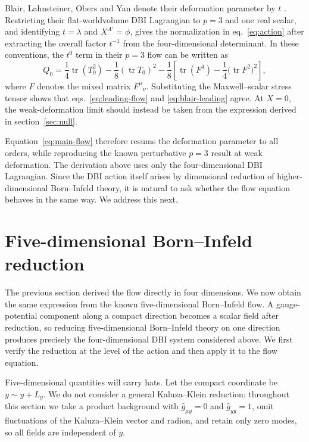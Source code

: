 \documentclass[a4paper,11pt]{article}
\numberwithin{equation}{section}
\newcommand{\tr}{\operatorname{tr}}
\begin{document}
Blair, Lahnsteiner, Obers and Yan denote their deformation parameter by $t$ \cite{Blair2025}. Restricting their flat-worldvolume DBI Lagrangian to $p=3$ and one real scalar, and identifying $t=\lambda$ and $X^{A'}=\phi$, gives the normalization in eq.~\eqref{eq:action} after extracting the overall factor $t^{-1}$ from the four-dimensional determinant. In these conventions, the $t^0$ term in their $p=3$ flow can be written as
\begin{equation}
 Q_0
 =\frac14\tr(T_0^2)-\frac18(\tr T_0)^2
 -\frac18\left[\tr(F^4)-\frac14\bigl(\tr F^2\bigr)^2\right],
 \label{eq:blair-leading}
\end{equation}
where $F$ denotes the mixed matrix $F^\mu{}_{\nu}$. Substituting the Maxwell--scalar stress tensor shows that eqs.~\eqref{eq:leading-flow} and \eqref{eq:blair-leading} agree. At $X=0$, the weak-deformation limit should instead be taken from the expression derived in section~\ref{sec:null}.

Equation~\eqref{eq:main-flow} therefore resums the deformation parameter to all orders, while reproducing the known perturbative $p=3$ result at weak deformation. The derivation above uses only the four-dimensional DBI Lagrangian. Since the DBI action itself arises by dimensional reduction of higher-dimensional Born--Infeld theory, it is natural to ask whether the flow equation behaves in the same way. We address this next.

\section{Five-dimensional Born--Infeld reduction}
\label{sec:reduction}

The previous section derived the flow directly in four dimensions. We now obtain the same expression from the known five-dimensional Born--Infeld flow. A gauge-potential component along a compact direction becomes a scalar field after reduction, so reducing five-dimensional Born--Infeld theory on one direction produces precisely the four-dimensional DBI system considered above. We first verify the reduction at the level of the action and then apply it to the flow equation.

Five-dimensional quantities will carry hats. Let the compact coordinate be $y\sim y+L_y$. We do not consider a general Kaluza--Klein reduction: throughout this section we take a product background with $\widehat g_{\mu y}=0$ and $\widehat g_{yy}=1$, omit fluctuations of the Kaluza--Klein vector and radion, and retain only zero modes, so all fields are independent of $y$.
\end{document}
